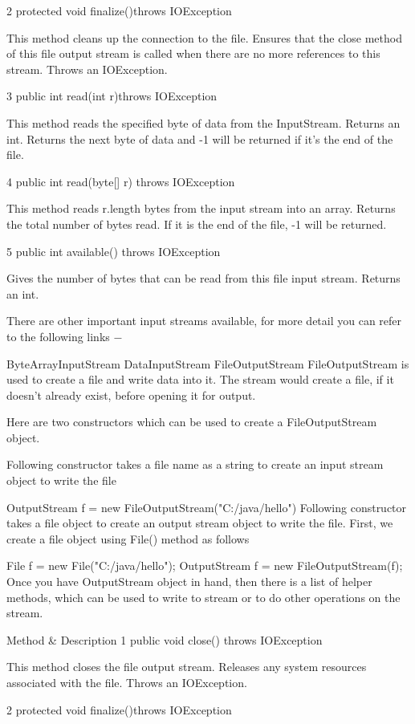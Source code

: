 2
protected void finalize()throws IOException {}

This method cleans up the connection to the file. Ensures that the close method of this file output stream is called when there are no more references to this stream. Throws an IOException.

3
 public int read(int r)throws IOException{}

This method reads the specified byte of data from the InputStream. Returns an int. Returns the next byte of data and -1 will be returned if it's the end of the file.

4
 public int read(byte[] r) throws IOException{}

This method reads r.length bytes from the input stream into an array. Returns the total number of bytes read. If it is the end of the file, -1 will be returned.

5
 public int available() throws IOException{}

Gives the number of bytes that can be read from this file input stream. Returns an int.

There are other important input streams available, for more detail you can refer to the following links −

ByteArrayInputStream
DataInputStream
FileOutputStream
FileOutputStream is used to create a file and write data into it. The stream would create a file, if it doesn't already exist, before opening it for output.

Here are two constructors which can be used to create a FileOutputStream object.

Following constructor takes a file name as a string to create an input stream object to write the file

OutputStream f = new FileOutputStream("C:/java/hello")
Following constructor takes a file object to create an output stream object to write the file. First, we create a file object using File() method as follows

File f = new File("C:/java/hello");
OutputStream f = new FileOutputStream(f);
Once you have OutputStream object in hand, then there is a list of helper methods, which can be used to write to stream or to do other operations on the stream.

 	Method & Description
1
public void close() throws IOException{}

This method closes the file output stream. Releases any system resources associated with the file. Throws an IOException.

2
protected void finalize()throws IOException {}

